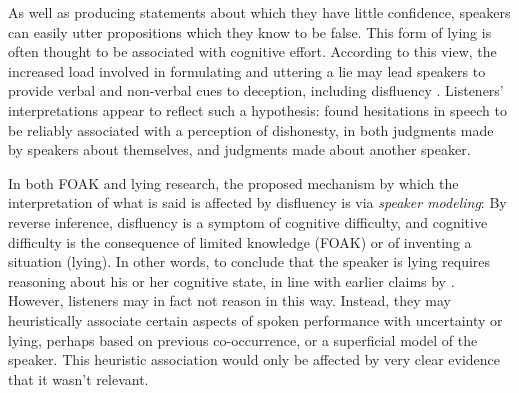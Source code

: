 \documentclass[a4paper,man,natbib]{apa6}
\newcommand*{\term}[1]{\emph{#1}} %
\begin{document}

As well as producing statements about which they have little confidence, speakers can easily utter propositions which they know to be false.
This form of lying is often thought to be associated with cognitive effort.
According to this view, the increased load involved in formulating and uttering a lie may lead speakers to provide verbal and non-verbal cues to deception, including disfluency \citep{Zuckerman1981,depaulo2003cues}.
Listeners' interpretations appear to reflect such a hypothesis:
\citet{Zuckerman1981} found hesitations in speech to be reliably associated with a perception of dishonesty, in both judgments made by speakers about themselves, and judgments made about another speaker.

In both FOAK and lying research, the proposed mechanism by which the interpretation of what is said is affected by disfluency is via \term{speaker modeling}:
By reverse inference, disfluency is a symptom of cognitive difficulty, and cognitive difficulty is the consequence of limited knowledge (FOAK) or of inventing a situation (lying).
In other words, to conclude that the speaker is lying requires reasoning about his or her cognitive state, in line with earlier claims by \citet{Arnold2007}.
However, listeners may in fact not reason in this way.
Instead, they may heuristically associate certain aspects of spoken performance with uncertainty or lying, perhaps based on previous co-occurrence, or a superficial model of the speaker.
This heuristic association would only be affected by very clear evidence that it wasn't relevant.
\end{document}
